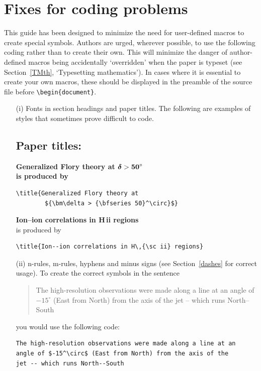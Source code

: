 \documentclass{nCSE2e}
\begin{document}
\section{Fixes for coding problems}

This guide has been designed to minimize the need for user-defined macros to create special symbols. Authors
are urged, wherever possible, to use the following coding rather than to create their own. This will minimize
the danger of author-defined macros being accidentally `overridden' when the paper is typeset (see
Section~\ref{TMth}, `Typesetting mathematics'). In cases where it is essential to create your own macros,
these should be displayed in the preamble of the source file before \verb"\begin{document}".

%
\begin{enumerate}
\item[(i)] Fonts in section headings and paper titles. The following are  examples
of styles that sometimes prove difficult to code.


\subsection*{Paper titles:}

\bf{\noindent Generalized Flory theory at ${\bm\delta >
{\bf
   50}^\circ}$}\\

    \noindent\normalfont is produced by
\begin{verbatim}
\title{Generalized Flory theory at
        ${\bm\delta > {\bfseries 50}^\circ}$}
\end{verbatim}
\bigskip

{\bf{\noindent Ion--ion correlations in H\,{\sc ii} regions}}\\

\noindent\normalfont is produced by
%
\begin{verbatim}
\title{Ion--ion correlations in H\,{\sc ii} regions}
\end{verbatim}



\item[(ii)] n-rules, m-rules, hyphens and minus signs (see Section~\ref{dashes} for
correct usage). To create the correct symbols in the sentence
%
\begin{quote}
The high-resolution observations were made along a line at an
angle of $-15^\circ$ (East from North) from the axis of the
jet -- which runs North--South
\end{quote}
you would use the following code:
%
\begin{verbatim}
The high-resolution observations were made along a line at an
angle of $-15^\circ$ (East from North) from the axis of the
jet -- which runs North--South
\end{verbatim}


\end{enumerate}
\end{document}
